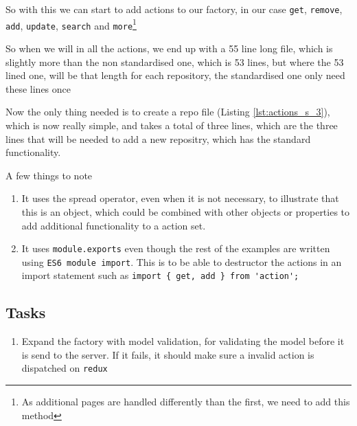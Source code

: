 So with this we can start to add actions to our factory, in our case \lstinline{get}, \lstinline{remove}, \lstinline{add}, \lstinline{update}, \lstinline{search} and \lstinline{more}\footnote{As additional pages are handled differently than the first, we need to add this method}



So when we will in all the actions, we end up with a 55 line long file, which is slightly more than the non standardised one, which is 53 lines, but where the 53 lined one, will be that length for each repository, the standardised one only need these lines once

Now the only thing needed is to create a repo file (Listing \ref{lst:actions_s_3}), which is now really simple, and takes a total of three lines, which are the three lines that will be needed to add a new repositry, which has the standard functionality.

A few things to note

\begin{enumerate}
\item It uses the spread operator, even when it is not necessary, to illustrate that this is an object, which could be combined with other objects or properties to add additional functionality to a action set.
\item It uses \lstinline{module.exports} even though the rest of the examples are written using \lstinline{ES6 module import}. This is to be able to destructor the actions in an import statement such as \lstinline|import { get, add } from 'action';|
\end{enumerate}



\subsection*{Tasks}

\begin{enumerate}
\item Expand the factory with model validation, for validating the model before it is send to the server. If it fails, it should make sure a invalid action is dispatched on \lstinline{redux}	
\end{enumerate}
